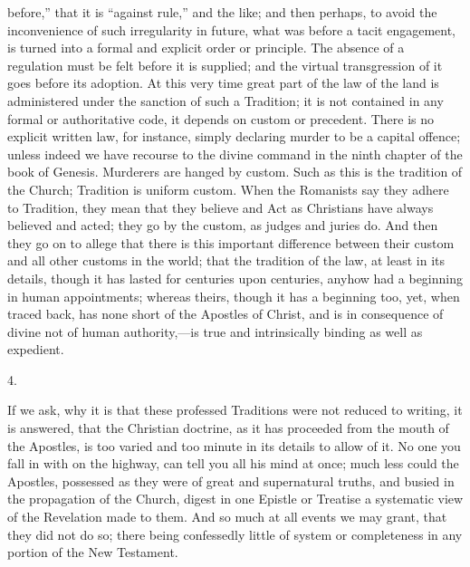 before,'' that it is ``against rule,'' and the like; and
then perhaps, to avoid the inconvenience of such irregularity in
future, what was before a tacit engagement, is turned into a formal
and explicit order or principle. The absence of a regulation must
be felt before it is supplied; and the virtual transgression of it
goes before its adoption. At this very time great part of the law of
the land is administered under the sanction of such a Tradition; it is
not contained in any formal or authoritative code, it depends on
custom or precedent. There is no explicit written law, for instance,
simply declaring murder to be a capital offence; unless indeed we have
recourse to the divine command in the ninth chapter of the book of
Genesis. Murderers are hanged by custom. Such as this is the tradition
of the Church; Tradition is uniform custom. When the Romanists say
they adhere to Tradition, they mean that they believe and Act as
Christians have always believed and acted; they go by the custom, as
judges and juries do. And then they go on to allege that there is this
important difference between their custom and all other customs in the
world; that the tradition of the law, at least in its details, though
it has lasted for centuries upon centuries, anyhow had a beginning in
human appointments; whereas theirs, though it has a beginning too,
yet, when traced back, has none short of the Apostles of Christ, and
is in consequence of divine not of human authority,—is true and
intrinsically binding as well as expedient.

4.

If we ask, why it is that these professed Traditions were not
reduced to writing, it is answered, that the Christian doctrine, as it
has proceeded from the mouth of the Apostles, is too varied and too
minute in its details to allow of it. No one you fall in with on the
highway, can tell you all his mind at once; much less could the
Apostles, possessed as they were of great and supernatural truths, and
busied in the propagation of the Church, digest in one Epistle or
Treatise a systematic view of the Revelation made to them. And so
much at all events we may grant, that they did not do so; there being
confessedly little of system or completeness in any portion of the New
Testament.

